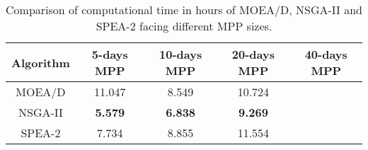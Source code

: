 \begin{table}[H]
\centering
\begin{tabular}{|c|c|c|c|c|}
\hline
\textbf{Algorithm} & \textbf{5-days MPP} & \textbf{10-days MPP} & \textbf{20-days MPP} & \textbf{40-days MPP} \\ \hline
MOEA/D & 11.047 & 8.549 & 10.724 &  \\ \hline
NSGA-II & \textbf{5.579} & \textbf{6.838} & \textbf{9.269} &  \\ \hline
SPEA-2 & 7.734 & 8.855 & 11.554 &  \\ \hline
\end{tabular}
\caption{Comparison of computational time in hours of MOEA/D, NSGA-II and SPEA-2 facing different MPP sizes.}
\label{table:times}
\end{table}